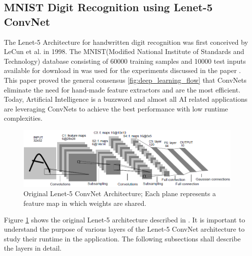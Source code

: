 \subsection{MNIST Digit Recognition using Lenet-5 ConvNet}
\label{3_1_1}
The Lenet-5 Architecture for handwritten digit recognition was first conceived by LeCun et al. in 1998. The MNIST(Modified National Institute of Standards and Technology) database consisting of 60000 training samples and 10000 test inputs available for download in \cite{mnist_database} was used for the experiments discussed in the paper \cite{lecun1998gradient}. This paper proved the general consensus \ref{fig:deep_learning_flow}  that ConvNets eliminate the need for hand-made feature extractors and are the most efficient. Today, Artificial Intelligence is a buzzword and almost all AI related applications are leveraging ConvNets to achieve the best performance with low runtime complexities. 
\begin{figure}[h!]
  \centering
  \includegraphics[width=\linewidth]{figures/Lenet-5-org.PNG}
  \caption{Original Lenet-5 ConvNet Architecture; Each plane represents a feature map in which weights are shared.
  \cite{lecun1998gradient}}
  \label{fig:Lenet-5-org}
\end{figure}
Figure \ref{fig:Lenet-5-org} shows the original Lenet-5 architecture described in \cite{lecun1998gradient}. 
It is important to understand the purpose of various layers of the Lenet-5 ConvNet architecture to study their runtime in the application. The following subsections shall describe the layers in detail.
